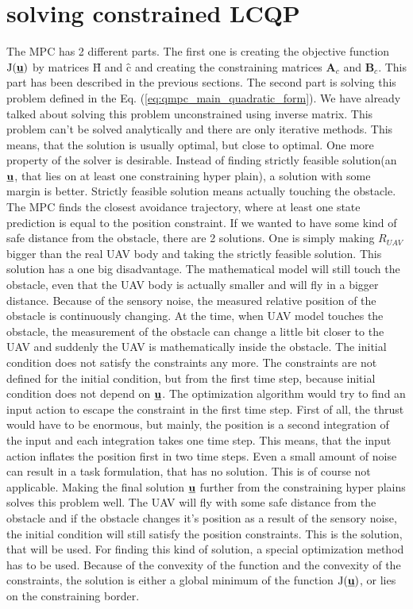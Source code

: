 \documentclass[a4paper,11pt,titlepage]{article}
\newcommand{\uvec}{\textbf{\underline{u}}}
\newcommand{\macJ}{\mathrm{J}(\uvec)}
\begin{document}
\section{solving constrained LCQP}
The MPC has 2 different parts. The first one is creating the objective function $\macJ$ by matrices $\textbf{\^H}$ and $\textbf{\^c}$ and creating the constraining matrices $\textbf{A}_c$ and $\textbf{B}_c$. This part has been described in the previous sections. The second part is solving this problem defined in the Eq. (\ref{eq:qmpc_main_quadratic_form}). We have already talked about solving this problem unconstrained using inverse matrix. This problem can't be solved analytically and there are only iterative methods. This means, that the solution is usually optimal, but close to optimal. One more property of the solver is desirable. Instead of finding strictly feasible solution(an $\uvec$, that lies on at least one constraining hyper plain), a solution with some margin is better. Strictly feasible solution means actually touching the obstacle. The MPC finds the closest avoidance trajectory, where at least one state prediction is equal to the position constraint. If we wanted to have some kind of safe distance from the obstacle, there are 2 solutions. One is simply making $R_{UAV}$ bigger than the real UAV body and taking the strictly feasible solution. This solution has a one big disadvantage. The mathematical model will still touch the obstacle, even that the UAV body is actually smaller and will fly in a bigger distance. Because of the sensory noise, the measured relative position of the obstacle is continuously changing. At the time, when UAV model touches the obstacle, the measurement of the obstacle can change a little bit closer to the UAV and suddenly the UAV is mathematically inside the obstacle. The initial condition does not satisfy the constraints any more. The constraints are not defined for the initial condition, but from the first time step, because initial condition does not depend on $\uvec$. The optimization algorithm would try to find an input action to escape the constraint in the first time step. First of all, the thrust would have to be enormous, but mainly, the position is a second integration of the input and each integration takes one time step. This means, that the input action inflates the position first in two time steps. Even a small amount of noise can result in a task formulation, that has no solution. This is of course not applicable. Making the final solution $\uvec$ further from the constraining hyper plains solves this problem well. The UAV will fly with some safe distance from the obstacle and if the obstacle changes it's position as a result of the sensory noise, the initial condition will still satisfy the position constraints. This is the solution, that will be used. For finding this kind of solution, a special optimization method has to be used. Because of the convexity of the function and the convexity of the constraints, the solution is either a global minimum of the function $\macJ$, or lies on the constraining border.
\end{document}

